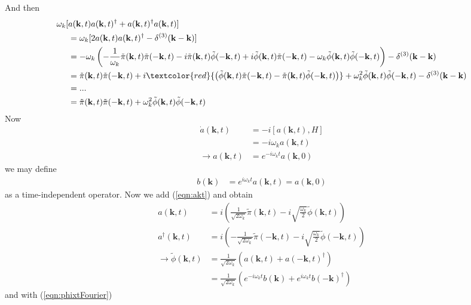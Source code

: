 \documentclass{article}
\begin{document}
And then
\begin{align*}
\omega_k[&a(\mathbf{k},t)a(\mathbf{k},t)^\dagger+a(\mathbf{k},t)^\dagger a(\mathbf{k},t)]\\
&=\omega_k[2a(\mathbf{k},t)a(\mathbf{k},t)^\dagger-\delta^{(3)}(\mathbf{k-k})] \\
&=-\omega_k\left(
-\frac{1}{\omega_k}\tilde\pi(\mathbf{k},t)\tilde\pi(-\mathbf{k},t)
-i\tilde\pi(\mathbf{k},t)\tilde\phi(-\mathbf{k},t)
+i\tilde\phi(\mathbf{k},t)\tilde\pi(-\mathbf{k},t)
-\omega_k\tilde\phi(\mathbf{k},t)\tilde\phi(-\mathbf{k},t)\right)-\delta^{(3)}(\mathbf{k-k})\\
&=\tilde\pi(\mathbf{k},t)\tilde\pi(-\mathbf{k},t)
+i\textcolor{red}{\left(\tilde\phi(\mathbf{k},t)\tilde\pi(-\mathbf{k},t)
-\tilde\pi(\mathbf{k},t)\tilde\phi(-\mathbf{k},t)\right)}
+\omega_k^2\tilde\phi(\mathbf{k},t)\tilde\phi(-\mathbf{k},t)-\delta^{(3)}(\mathbf{k-k})\\
&=...\\
&=\tilde\pi(\mathbf{k},t)\tilde\pi(-\mathbf{k},t)
+\omega_k^2\tilde\phi(\mathbf{k},t)\tilde\phi(-\mathbf{k},t)
\end{align*}
Now
\begin{align}
\dot{a}(\mathbf{k},t)
&=-i[a(\mathbf{k},t),H]\\
&=-i\omega_ka(\mathbf{k},t)\\
\rightarrow a(\mathbf{k},t)&=e^{-i\omega_kt}a(\mathbf{k},0)
\end{align}
we may define 
\begin{align}
b(\mathbf{k})&=e^{i\omega_kt}a(\mathbf{k},t)=a(\mathbf{k},0)
\end{align}
as a time-independent operator.
Now we add (\ref{eqn:akt}) and obtain
\begin{align}
a(\mathbf{k},t)
&=i\left(\frac{1}{\sqrt{2\omega_k}}\tilde\pi(\mathbf{k},t)-i\sqrt{\frac{\omega_k}{2}}\tilde\phi(\mathbf{k},t)\right)\\
a^\dagger(\mathbf{k},t)
&=i\left(-\frac{1}{\sqrt{2\omega_k}}\tilde\pi(-\mathbf{k},t)-i\sqrt{\frac{\omega_k}{2}}\tilde\phi(-\mathbf{k},t)\right)\\
\rightarrow\tilde\phi(\mathbf{k},t)
&=\frac{1}{\sqrt{2\omega_k}}\left(a(\mathbf{k},t)+a(-\mathbf{k},t)^\dagger\right)\\
&=\frac{1}{\sqrt{2\omega_k}}\left(e^{-i\omega_kt}b(\mathbf{k})+e^{i\omega_kt}b(-\mathbf{k})^\dagger\right)
\end{align}
and with (\ref{eqn:phixtFourier})
\end{document}
